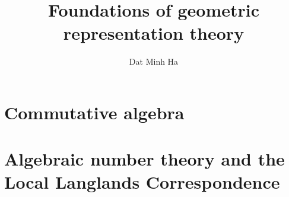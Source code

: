 




    \frontmatter

	\title{Foundations of geometric representation theory}
	
	\author{Dat Minh Ha}
	\maketitle
	
	{
      \hypersetup{} 
      \dominitoc
      \tableofcontents %
    }
	
	\newpage
	
	{
      \hypersetup{hidelinks} 
      \listoftodos
    }
    
    
	
	
	
	\mainmatter
	
	\part{Commutative algebra}  
        
	
	    
	    
	    
	    
	    
	    
	    
	    
	    
	    
	    
	
	\part{Algebraic number theory and the Local Langlands Correspondence}
	    
	
	    
	    
	    
	    
	    
	    
	    
	    
	    
	    
	    
	    
